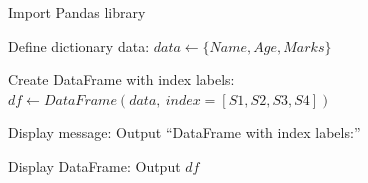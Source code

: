 \begin{algorithm}
\caption{Create and Display a Pandas DataFrame with Index Labels}
\begin{algorithmic}[1]

\STATE Import Pandas library

\STATE Define dictionary data:
\STATE $data \gets \{Name, Age, Marks\}$

\STATE Create DataFrame with index labels:
\STATE $df \gets DataFrame(data,\ index = [S1, S2, S3, S4])$

\STATE Display message:
\STATE Output ``DataFrame with index labels:''

\STATE Display DataFrame:
\STATE Output $df$

\end{algorithmic}
\end{algorithm}